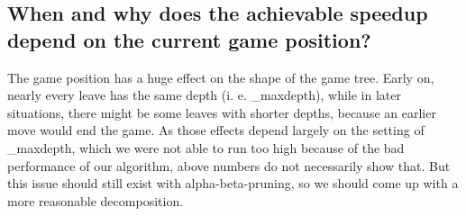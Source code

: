 \subsection*{When and why does the achievable speedup depend on the current game position?}
The game position has a huge effect on the shape of the game tree. Early on, nearly every leave has the same depth (i. e. \_maxdepth), while in later situations, there might be some leaves with shorter depths, because an earlier move would end the game. As those effects depend largely on the setting of \_maxdepth, which we were not able to run too high because of the bad performance of our algorithm, above numbers do not necessarily show that. But this issue should still exist with alpha-beta-pruning, so we should come up with a more reasonable decomposition.
